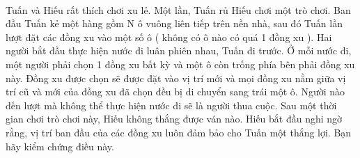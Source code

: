  

Tuấn và Hiếu rất thích chơi xu lẻ. Một lần, Tuấn rủ Hiếu chơi một trò chơi. Ban đầu Tuấn kẻ một hàng gồm N ô vuông liên tiếp trên nền nhà, sau đó Tuấn lần lượt đặt các đồng xu vào một số ô ( không có ô nào có quá 1 đồng xu ). Hai người bắt đầu thực hiện nước đi luân phiên nhau, Tuấn đi trước. Ở mỗi nước đi, một người phải chọn 1 đồng xu bất kỳ và một ô còn trống phía bên phải đồng xu này. Đồng xu được chọn sẽ được đặt vào vị trí mới và mọi đồng xu nằm giữa vị trí cũ và mới của đồng xu đã chọn đều bị di chuyển sang trái một ô. Người nào đến lượt mà không thể thực hiện nước đi sẽ là người thua cuộc. Sau một thời gian chơi trò chơi này, Hiếu không thắng được ván nào. Hiếu bắt đầu nghi ngờ rằng, vị trí ban đầu của các đồng xu luôn đảm bảo cho Tuấn một thắng lợi. Bạn hãy kiểm chứng điều này.

\